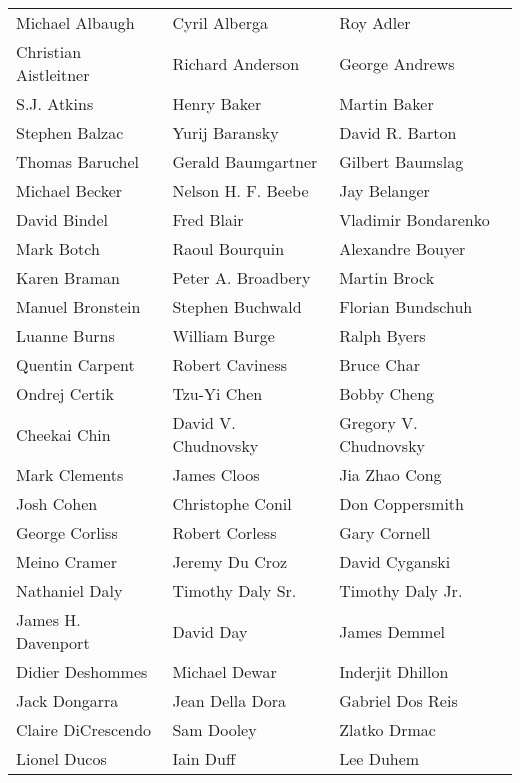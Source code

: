\begin{tabular}{lll}
Michael Albaugh        & Cyril Alberga          & Roy Adler\\
Christian Aistleitner  & Richard Anderson       & George Andrews\\
S.J. Atkins            & Henry Baker            & Martin Baker\\
Stephen Balzac         & Yurij Baransky         & David R. Barton\\
Thomas Baruchel        & Gerald Baumgartner     & Gilbert Baumslag\\
Michael Becker         & Nelson H. F. Beebe     & Jay Belanger\\
David Bindel           & Fred Blair             & Vladimir Bondarenko\\
Mark Botch             & Raoul Bourquin         & Alexandre Bouyer\\
Karen Braman           & Peter A. Broadbery     & Martin Brock\\
Manuel Bronstein       & Stephen Buchwald       & Florian Bundschuh\\
Luanne Burns           & William Burge          & Ralph Byers\\
Quentin Carpent        & Robert Caviness        & Bruce Char\\
Ondrej Certik          & Tzu-Yi Chen            & Bobby Cheng\\
Cheekai Chin           & David V. Chudnovsky    & Gregory V. Chudnovsky\\
Mark Clements          & James Cloos            & Jia Zhao Cong\\
Josh Cohen             & Christophe Conil       & Don Coppersmith\\
George Corliss         & Robert Corless         & Gary Cornell\\
Meino Cramer           & Jeremy Du Croz         & David Cyganski\\
Nathaniel Daly         & Timothy Daly Sr.       & Timothy Daly Jr.\\
James H. Davenport     & David Day              & James Demmel\\
Didier Deshommes       & Michael Dewar          & Inderjit Dhillon\\
Jack Dongarra          & Jean Della Dora        & Gabriel Dos Reis\\
Claire DiCrescendo     & Sam Dooley             & Zlatko Drmac\\
Lionel Ducos           & Iain Duff              & Lee Duhem\\

\end{tabular}
